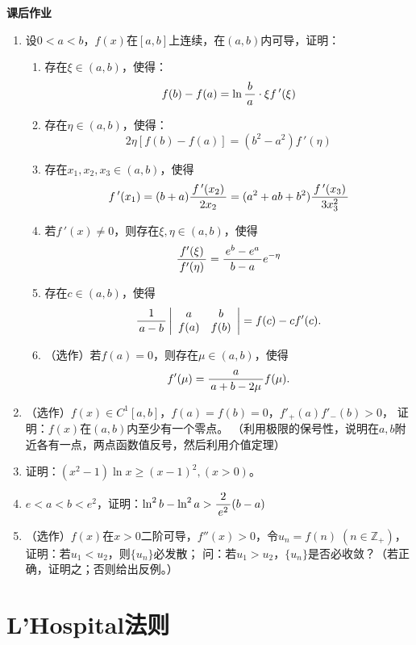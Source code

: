 \begin{ext}
	{\bf 课后作业}
	
	\begin{enumerate}
	  \item 设$0<a<b$，$f(x)$在$[a,b]$上连续，在$(a,b)$内可导，证明：
		\begin{enumerate}[(1)]
		  \item 存在$\xi\in(a,b)$，使得：
			$$f(b)-f(a)=\ln\displaystyle\frac{\,{b}\,}{\,{a}\,}\cdot \xi f\,'(\xi)$$
		  \item 存在$\eta\in(a,b)$，使得：
		    $$2\eta[f(b)-f(a)]=(b^2-a^2)f\,'(\eta)$$
		  \item 存在$x_1,x_2,x_3\in(a,b)$，使得
			$$f\,'(x_1)=(b+a)\displaystyle\frac{\,{f\,'(x_2)}\,}{\,{2x_2}\,}=(a^2+ab+b^2)
			\displaystyle\frac{\,{f\,'(x_3)}\,}{\,{3x_3^2}\,}$$ 
		  \item 若$f\,'(x)\ne 0$，则存在$\xi,\eta\in(a,b)$，使得
			$$\displaystyle\frac{\,{f'(\xi)}\,}{\,{f'(\eta)}\,}=\displaystyle\frac{\,{e^b-e^a}\,}{\,{b-a}\,}e^{-\eta}$$
		  \item 存在$c\in(a,b)$，使得
			$$\displaystyle\frac{\,{1}\,}{\,{a-b}\,}\left|\begin{array}{cc}
			a & b\\ f(a) & f(b)
			\end{array}\right|=f(c)-cf'(c).$$
		  \item （选作）若$f(a)=0$，则存在$\mu\in(a,b)$，使得
		  $$f'(\mu)=\displaystyle\frac{\,{a}\,}{\,{a+b-2\mu}\,}f(\mu).$$
		\end{enumerate}
	  \item （选作）$f(x)\in C^1[a,b]$，$f(a)=f(b)=0$，$f'_+(a)f'_-(b)>0$，
	  证明：$f(x)$在$(a,b)$内至少有一个零点。
	  （利用极限的保号性，说明在$a,b$附近各有一点，两点函数值反号，然后利用介值定理）
	  \item 证明：$(x^2-1)\ln x\geq(x-1)^2,(x>0)$。
	  \item $e<a<b<e^2$，证明：$\ln^2b-\ln^2a>\displaystyle\frac{\,{2}\,}{\,{e^2}\,}(b-a)$
	  \item （选作）$f(x)$在$x>0$二阶可导，$f''(x)>0$，令$u_n=f(n)\;
	  (n\in\mathbb{Z}_+)$，证明：若$u_1<u_2$，则$\{u_n\}$必发散；
	  问：若$u_1>u_2$，$\{u_n\}$是否必收敛？（若正确，证明之；否则给出反例。）
	\end{enumerate}
\end{ext}

\section{L'Hospital法则}

